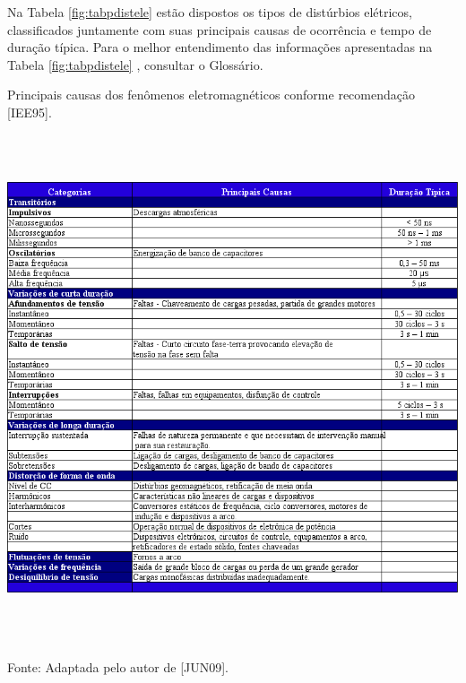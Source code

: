 \par
Na Tabela \ref{fig:tabpdistele} estão dispostos os tipos de distúrbios elétricos, classificados juntamente com suas principais causas de ocorrência e tempo de duração típica. Para o melhor entendimento das informações apresentadas na Tabela \ref{fig:tabpdistele} , consultar o Glossário.%
\begin{table}[hbt]
\begin{center}
\caption{Principais causas dos fenômenos eletromagnéticos conforme recomendação [IEE95].}
\includegraphics[height=15cm]{imagens/tab1_cap2.png}
\par{\small Fonte: Adaptada pelo autor de [JUN09].}
\label{fig:tabpdistele}
\end{center}
\end{table}

